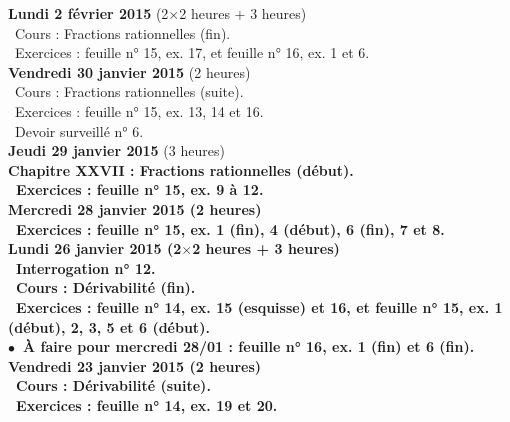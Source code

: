 \documentclass[12pt,a4paper]{article}
\begin{document}

\noindent\textbf{\bf Lundi 2 février 2015 \rm} (2$\times$2 heures + 3 heures)\\
\bu\ Cours : Fractions rationnelles (fin).\\
\bu\ Exercices : feuille n° 15, ex. 17, et feuille n° 16, ex. 1 et 6.\vspace{.4cm}\\

\noindent\textbf{ \bf Vendredi 30 janvier 2015 \rm}(2 heures)\\
\bu\ Cours : Fractions rationnelles (suite).\\
\bu\ Exercices : feuille n° 15, ex. 13, 14 et 16.\\
\bu\ Devoir surveillé n° 6.\vspace{.4cm}\\

\noindent\textbf{ \bf Jeudi 29 janvier 2015 \rm}(3 heures)\\
\bf Chapitre XXVII \rm : Fractions rationnelles (début).\\
\bu\ Exercices : feuille n° 15, ex. 9 à 12.\vspace{.4cm}\\

\noindent\textbf{ Mercredi 28 janvier 2015 \rm} (2 heures)\\
\bu\ Exercices : feuille n° 15, ex. 1 (fin), 4 (début), 6 (fin), 7 et 8.\vspace{.4cm}\\

\noindent\textbf{ Lundi 26 janvier 2015 \rm} (2$\times$2 heures + 3 heures)\\
\bu\ Interrogation n° 12.\\
\bu\ Cours : Dérivabilité (fin).\\
\bu\ Exercices : feuille n° 14, ex. 15 (esquisse) et 16, et feuille n° 15, ex. 1 (début), 2, 3, 5 
et 6 (début).\\
$\bullet$\ À faire pour mercredi 28/01 : feuille n° 16, ex. 1 (fin) et
6 (fin).\vspace{.4cm}\\

\noindent\textbf{ \bf Vendredi 23 janvier 2015 \rm}(2 heures)\\
\bu\ Cours : Dérivabilité (suite).\\
\bu\ Exercices : feuille n° 14, ex. 19 et 20.\vspace{.4cm}\\
\end{document}
